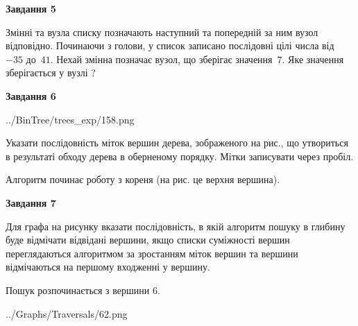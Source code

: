 \documentclass[12pt, ukrainian]{article}
\begin{document}
{\begin {large}
{\begin {center}\textbf{Завдання 5}\end {center}}\par
Змінні  та  вузла списку позначають наступний та попередній за ним вузол відповідно. Починаючи з голови, у список записано послідовні цілі числа від~$-35$ до~$41$. Нехай змінна  позначає вузол, що зберігає значення~$7$.
Яке значення зберігається у вузлі  ?\par
\newpage

{\begin {center}\textbf{Завдання 6}\end {center}}\par

\begin{center}
	{../BinTree/trees_exp/158.png}
\end{center}
Указати послідовність міток вершин дерева, зображеного на рис., що утвориться в результаті обходу дерева в оберненому порядку. Мітки записувати через пробіл.\par Алгоритм починає роботу з кореня (на рис. це верхня вершина).\par
\newpage

{\begin {center}\textbf{Завдання 7}\end {center}}\par
Для графа на рисунку вказати послідовність, в якій алгоритм пошуку в глибину буде відмічати відвідані вершини, якщо списки суміжності вершин переглядаються алгоритмом за зростанням міток вершин та вершини відмічаються на першому вход\-женні у вершину.\par
Пошук розпочинається з вершини 6.\par

\begin{center}
	{../Graphs/Traversals/62.png}
\end{center}\par
\newpage


\end{large}}
\end{document}
